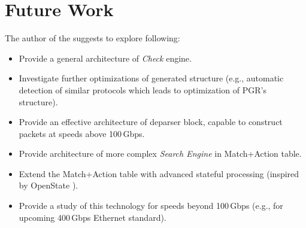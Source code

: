 \section{Future Work}
The author of the \thesis{} suggests to explore following:
\begin{itemize}
    \item Provide a general architecture of \textit{Check} engine.
    \item Investigate further optimizations of generated structure 
    (e.g., automatic detection of similar protocols which leads to optimization of PGR's structure).
    \item Provide an effective architecture of deparser block, capable to construct packets at speeds above 100\,Gbps.
    \item Provide architecture of more complex \textit{Search Engine} in Match+Action table.
    \item Extend the Match+Action table with advanced stateful processing (inspired by OpenState \cite{OpenStateSpec}).
    \item Provide a study of this technology for speeds beyond 100\,Gbps (e.g., for upcoming 400\,Gbps Ethernet standard).
\end{itemize}

